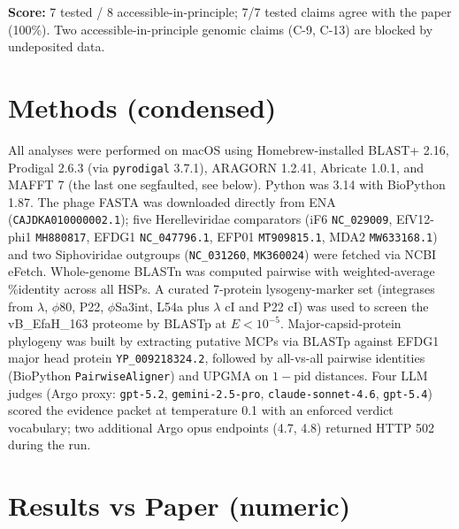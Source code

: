 \documentclass[11pt,letterpaper]{article}
\begin{document}
\textbf{Score:} 7 tested / 8 accessible-in-principle; 7/7 tested claims agree with the paper (100\%). Two accessible-in-principle genomic claims (C-9, C-13) are blocked by undeposited data.

\section{Methods (condensed)}

All analyses were performed on macOS using Homebrew-installed BLAST+ 2.16, Prodigal 2.6.3 (via \texttt{pyrodigal} 3.7.1), ARAGORN 1.2.41, Abricate 1.0.1, and MAFFT 7 (the last one segfaulted, see below). Python was 3.14 with BioPython 1.87. The phage FASTA was downloaded directly from ENA (\texttt{CAJDKA010000002.1}); five Herelleviridae comparators (iF6 \texttt{NC\_029009}, EfV12-phi1 \texttt{MH880817}, EFDG1 \texttt{NC\_047796.1}, EFP01 \texttt{MT909815.1}, MDA2 \texttt{MW633168.1}) and two Siphoviridae outgroups (\texttt{NC\_031260}, \texttt{MK360024}) were fetched via NCBI eFetch. Whole-genome BLASTn was computed pairwise with weighted-average \%identity across all HSPs. A curated 7-protein lysogeny-marker set (integrases from $\lambda$, $\phi 80$, P22, $\phi$Sa3int, L54a plus $\lambda$ cI and P22 cI) was used to screen the vB\_EfaH\_163 proteome by BLASTp at $E < 10^{-5}$. Major-capsid-protein phylogeny was built by extracting putative MCPs via BLASTp against EFDG1 major head protein \texttt{YP\_009218324.2}, followed by all-vs-all pairwise identities (BioPython \texttt{PairwiseAligner}) and UPGMA on $1 - \text{pid}$ distances. Four LLM judges (Argo proxy: \texttt{gpt-5.2}, \texttt{gemini-2.5-pro}, \texttt{claude-sonnet-4.6}, \texttt{gpt-5.4}) scored the evidence packet at temperature 0.1 with an enforced verdict vocabulary; two additional Argo opus endpoints (4.7, 4.8) returned HTTP 502 during the run.

\section{Results vs Paper (numeric)}
\end{document}
